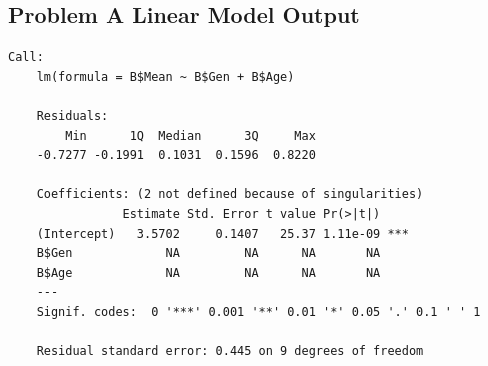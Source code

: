 \documentclass[11pt]{article}  %
\begin{document}
\subsection{Problem A Linear Model Output}
\label{sec:lmoutA}
\begin{lstlisting}[basicstyle=\small]
    Call:
    lm(formula = B$Mean ~ B$Gen + B$Age)
    
    Residuals:
        Min      1Q  Median      3Q     Max 
    -0.7277 -0.1991  0.1031  0.1596  0.8220 
    
    Coefficients: (2 not defined because of singularities)
                Estimate Std. Error t value Pr(>|t|)    
    (Intercept)   3.5702     0.1407   25.37 1.11e-09 ***
    B$Gen             NA         NA      NA       NA    
    B$Age             NA         NA      NA       NA    
    ---
    Signif. codes:  0 '***' 0.001 '**' 0.01 '*' 0.05 '.' 0.1 ' ' 1
    
    Residual standard error: 0.445 on 9 degrees of freedom
\end{lstlisting}
\end{document}
